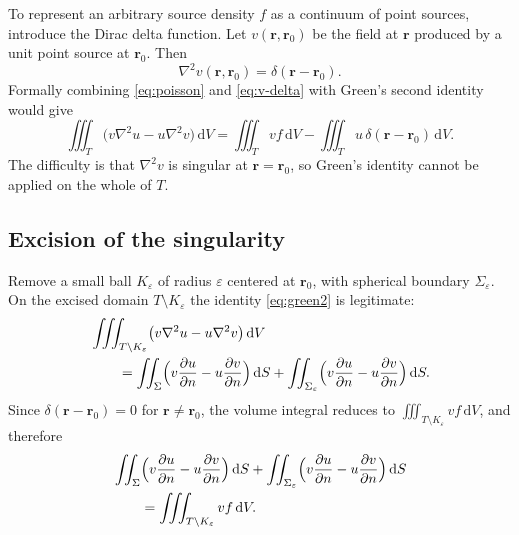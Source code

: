 To represent an arbitrary source density $f$ as a continuum of point sources, introduce the Dirac delta function. Let $v(\mathbf{r},\mathbf{r}_0)$ be the field at $\mathbf{r}$ produced by a unit point source at $\mathbf{r}_0$. Then
\begin{equation}
\label{eq:v-delta}
\nabla^2 v(\mathbf{r},\mathbf{r}_0)=\delta(\mathbf{r}-\mathbf{r}_0).
\end{equation}
Formally combining \eqref{eq:poisson} and \eqref{eq:v-delta} with Green's second identity would give
\begin{equation}
\iiint_{T}\bigl(v\nabla^2 u-u\nabla^2 v\bigr)\,\mathrm{d}V
=\iiint_{T}vf\,\mathrm{d}V
-\iiint_{T}u\,\delta(\mathbf{r}-\mathbf{r}_0)\,\mathrm{d}V.
\end{equation}
The difficulty is that $\nabla^2 v$ is singular at $\mathbf{r}=\mathbf{r}_0$, so Green's identity cannot be applied on the whole of $T$.

\subsection{Excision of the singularity}

Remove a small ball $K_\varepsilon$ of radius $\varepsilon$ centered at $\mathbf{r}_0$, with spherical boundary $\Sigma_\varepsilon$. On the excised domain $T\setminus K_\varepsilon$ the identity \eqref{eq:green2} is legitimate:
\begin{equation}
\begin{aligned}
&\iiint_{T\setminus K_\varepsilon}\bigl(v\nabla^2 u-u\nabla^2 v\bigr)\,\mathrm{d}V\\
&\qquad=
\iint_{\Sigma}\Bigl(v\frac{\partial u}{\partial n}-u\frac{\partial v}{\partial n}\Bigr)\,\mathrm{d}S
+\iint_{\Sigma_\varepsilon}\Bigl(v\frac{\partial u}{\partial n}-u\frac{\partial v}{\partial n}\Bigr)\,\mathrm{d}S.
\end{aligned}
\end{equation}
Since $\delta(\mathbf{r}-\mathbf{r}_0)=0$ for $\mathbf{r}\neq\mathbf{r}_0$, the volume integral reduces to $\iiint_{T\setminus K_\varepsilon}vf\,\mathrm{d}V$, and therefore
\begin{equation}
\label{eq:excised}
\begin{aligned}
&\iint_{\Sigma}\Bigl(v\frac{\partial u}{\partial n}-u\frac{\partial v}{\partial n}\Bigr)\,\mathrm{d}S
+\iint_{\Sigma_\varepsilon}\Bigl(v\frac{\partial u}{\partial n}-u\frac{\partial v}{\partial n}\Bigr)\,\mathrm{d}S\\
&\qquad=
\iiint_{T\setminus K_\varepsilon}vf\,\mathrm{d}V.
\end{aligned}
\end{equation}

